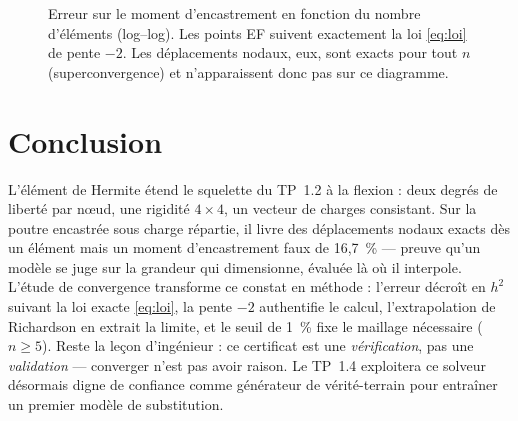 \documentclass[10pt,journal]{IEEEtran}
\begin{document}
\begin{figure}[!t]
\centering
{}
\caption{Erreur sur le moment d'encastrement en fonction du nombre d'éléments (log--log). Les points EF suivent exactement la loi \eqref{eq:loi} de pente $-2$. Les déplacements nodaux, eux, sont exacts pour tout $n$ (superconvergence) et n'apparaissent donc pas sur ce diagramme.}
\label{fig:conv}
\end{figure}

\section{Conclusion}
L'élément de Hermite étend le squelette du TP~1.2 à la flexion : deux degrés de liberté par n\oe{}ud, une rigidité $4\times 4$, un vecteur de charges consistant. Sur la poutre encastrée sous charge répartie, il livre des déplacements nodaux exacts dès un élément mais un moment d'encastrement faux de 16,7~\% --- preuve qu'un modèle se juge sur la grandeur qui dimensionne, évaluée là où il interpole. L'étude de convergence transforme ce constat en méthode : l'erreur décroît en $h^2$ suivant la loi exacte \eqref{eq:loi}, la pente $-2$ authentifie le calcul, l'extrapolation de Richardson en extrait la limite, et le seuil de 1~\% fixe le maillage nécessaire ($n\ge 5$). Reste la leçon d'ingénieur : ce certificat est une \emph{vérification}, pas une \emph{validation} --- converger n'est pas avoir raison. Le TP~1.4 exploitera ce solveur désormais digne de confiance comme générateur de vérité-terrain pour entraîner un premier modèle de substitution.
\end{document}
